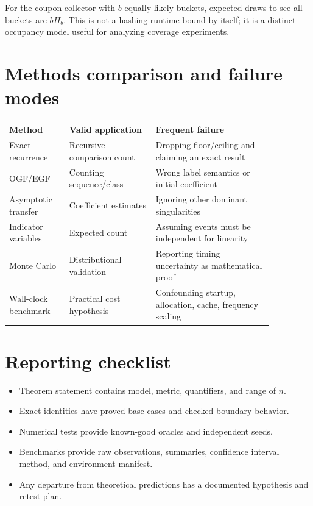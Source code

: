 \documentclass[11pt]{article}
\begin{document}
For the coupon collector with $b$ equally likely buckets, expected draws to see all buckets are $bH_b$. This is not a hashing runtime bound by itself; it is a distinct occupancy model useful for analyzing coverage experiments.

\section{Methods comparison and failure modes}
\begin{longtable}{p{0.19\linewidth}p{0.29\linewidth}p{0.38\linewidth}}
\toprule Method & Valid application & Frequent failure \\ \midrule
Exact recurrence & Recursive comparison count & Dropping floor/ceiling and claiming an exact result \\
OGF/EGF & Counting sequence/class & Wrong label semantics or initial coefficient \\
Asymptotic transfer & Coefficient estimates & Ignoring other dominant singularities \\
Indicator variables & Expected count & Assuming events must be independent for linearity \\
Monte Carlo & Distributional validation & Reporting timing uncertainty as mathematical proof \\
Wall-clock benchmark & Practical cost hypothesis & Confounding startup, allocation, cache, frequency scaling \\
\bottomrule
\end{longtable}

\section{Reporting checklist}
\begin{itemize}
\item Theorem statement contains model, metric, quantifiers, and range of $n$.
\item Exact identities have proved base cases and checked boundary behavior.
\item Numerical tests provide known-good oracles and independent seeds.
\item Benchmarks provide raw observations, summaries, confidence interval method, and environment manifest.
\item Any departure from theoretical predictions has a documented hypothesis and retest plan.
\end{itemize}
\end{document}
